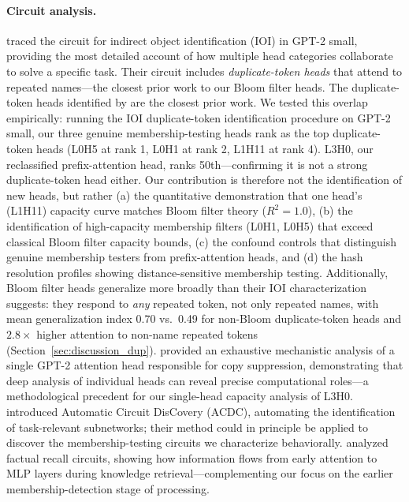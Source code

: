 \documentclass[11pt]{article}
\begin{document}
\paragraph{Circuit analysis.}
\citet{wang2022interpretability} traced the circuit for indirect object identification (IOI) in GPT-2 small, providing the most detailed account of how multiple head categories collaborate to solve a specific task. Their circuit includes \emph{duplicate-token heads} that attend to repeated names---the closest prior work to our Bloom filter heads. The duplicate-token heads identified by \citet{wang2022interpretability} are the closest prior work. We tested this overlap empirically: running the IOI duplicate-token identification procedure on GPT-2 small, our three genuine membership-testing heads rank as the top duplicate-token heads (L0H5 at rank 1, L0H1 at rank 2, L1H11 at rank 4). L3H0, our reclassified prefix-attention head, ranks 50th---confirming it is not a strong duplicate-token head either. Our contribution is therefore not the identification of new heads, but rather (a) the quantitative demonstration that one head's (L1H11) capacity curve matches Bloom filter theory ($R^2 = 1.0$), (b) the identification of high-capacity membership filters (L0H1, L0H5) that exceed classical Bloom filter capacity bounds, (c) the confound controls that distinguish genuine membership testers from prefix-attention heads, and (d) the hash resolution profiles showing distance-sensitive membership testing. Additionally, Bloom filter heads generalize more broadly than their IOI characterization suggests: they respond to \emph{any} repeated token, not only repeated names, with mean generalization index 0.70 vs.\ 0.49 for non-Bloom duplicate-token heads and $2.8\times$ higher attention to non-name repeated tokens (Section~\ref{sec:discussion_dup}). \citet{mcdougall2023copy} provided an exhaustive mechanistic analysis of a single GPT-2 attention head responsible for copy suppression, demonstrating that deep analysis of individual heads can reveal precise computational roles---a methodological precedent for our single-head capacity analysis of L3H0. \citet{conmy2023towards} introduced Automatic Circuit DisCovery (ACDC), automating the identification of task-relevant subnetworks; their method could in principle be applied to discover the membership-testing circuits we characterize behaviorally. \citet{geva2023dissecting} analyzed factual recall circuits, showing how information flows from early attention to MLP layers during knowledge retrieval---complementing our focus on the earlier membership-detection stage of processing.
\end{document}
